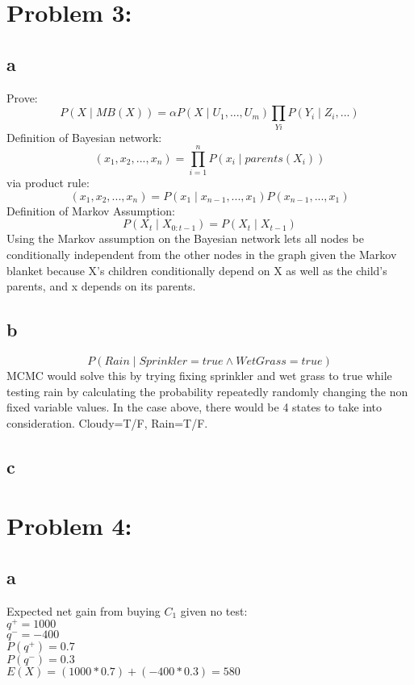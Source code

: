 \documentclass[11pt, oneside]{article}   	%
\begin{document}
\begin{flushleft}
\section*{Problem 3:}
\subsection*{a}
Prove:
$$P(X \mid MB(X)) = \alpha P(X \mid U_{1}, ..., U_{m}) \prod_{Yi} P(Y_{i} \mid Z_{i}, ...)$$
Definition of Bayesian network:
$$(x_{1},x_{2},...,x_{n})=\prod_{i=1}^{n} P(x_{i} \mid parents(X_{i}))$$
via product rule:
$$(x_{1},x_{2},...,x_{n})=P(x_{1} \mid x_{n-1}, ..., x_{1})P(x_{n-1},...,x_{1})$$
Definition of Markov Assumption:
$$P(X_{t} \mid X_{0:t-1}) = P(X_{t} \mid X_{t-1})$$
Using the Markov assumption on the Bayesian network lets all nodes be conditionally independent from the other nodes in the graph given the Markov blanket because X's children  conditionally depend on X as well as the child's parents, and x depends on its parents.
\subsection*{b}
$$P(Rain \mid Sprinkler=true \wedge WetGrass=true)$$
MCMC would solve this by trying fixing sprinkler and wet grass to true while testing rain by calculating the probability repeatedly randomly changing the non fixed variable values. In the case above, there would be 4 states to take into consideration. Cloudy=T/F, Rain=T/F.
\subsection*{c}
\section*{Problem 4:}
\subsection*{a}
Expected net gain from buying $C_1$ given no test:\\
$q^+ = 1000$\\
$q^- = -400$\\
$P(q^+ ) = 0.7$\\
$P(q^- ) = 0.3$\\
$E(X) = (1000*0.7)+(-400*0.3) = 580$\\

\end{flushleft}
\end{document}
